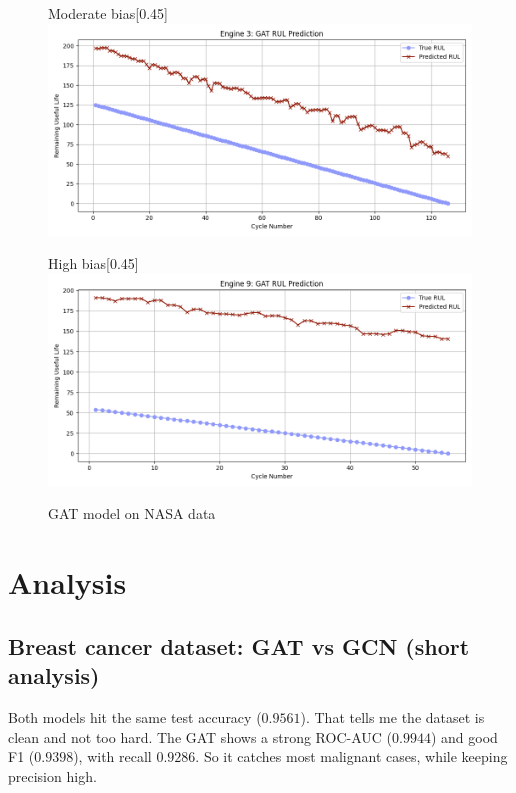 \documentclass[12pt]{article}
\begin{document}
\begin{figure}[H]
    \begin{subcaptionbox}{Moderate bias\label{fig_NASA_GAT_eng2}}[0.45\textwidth]
        {\includegraphics[width=\linewidth]{figures/NASA/NASA_GAT_eng1.png}}
    \end{subcaptionbox}
    \hfill
    \begin{subcaptionbox}{High bias\label{fig_NASA_GAT_eng3}}[0.45\textwidth]
        {\includegraphics[width=\linewidth]{figures/NASA/NASA_GAT_eng3.png}}
    \end{subcaptionbox}

    \caption{GAT model on NASA data}
    \label{GAT_NASA_all}
\end{figure}


\pagebreak
\section{Analysis} \label{sec_analysis}

\subsection*{Breast cancer dataset: GAT vs GCN (short analysis)}

Both models hit the same test accuracy ($0.9561$). That tells me the dataset is clean and not too hard. The GAT shows a strong ROC-AUC ($0.9944$) and good F1 ($0.9398$), with recall $0.9286$. So it catches most malignant cases, while keeping precision high.
\end{document}
